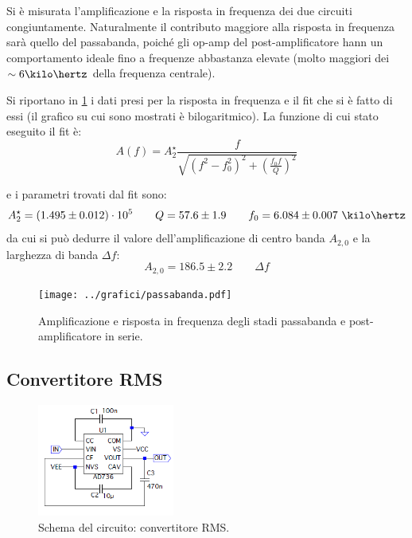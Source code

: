 \documentclass[a4paper,10pt]{article}
\begin{document}
Si è misurata l'amplificazione e la risposta in frequenza dei due circuiti congiuntamente. Naturalmente il contributo maggiore alla risposta in frequenza sarà quello del passabanda, poiché gli op-amp del post-amplificatore hann un comportamento ideale fino a frequenze abbastanza elevate (molto maggiori dei $\sim 6 \kilo\hertz $ della frequenza centrale).

Si riportano in \cref{fig:bandpass} i dati presi per la risposta in frequenza e il fit che si è fatto di essi (il grafico su cui sono mostrati è bilogaritmico).
La funzione di cui stato eseguito il fit è:
\[ A(f) = A_2^\star \frac{f}{\sqrt{(f^2-f_0^2)^2 + \left(\frac{f_0 f}{Q}\right)^2}} \]

e i parametri trovati dal fit sono:
\[ A_2^\star=(1.495 \pm 0.012)\cdot10^5 \qquad Q=57.6 \pm 1.9 \qquad f_0=6.084 \pm 0.007~\kilo\hertz  \]
da cui si può dedurre il valore dell'amplificazione di centro banda $ A_{2,0} $ e la larghezza di banda $ \Delta f $:
\[ A_{2,0} = 186.5 \pm 2.2	\qquad	\Delta f \]

\begin{figure}[H]
	\centering
	\texttt{[image: ../grafici/passabanda.pdf]}
	\vspace*{10pt}
	\caption{Amplificazione e risposta in frequenza degli stadi passabanda e post-amplificatore in serie.}
	\label{fig:bandpass}
\end{figure}

\subsection{Convertitore RMS}

\begin{figure}
	\vspace{-10pt}
	\centering
	\includegraphics[width=0.4\textwidth]{../grafici/RMSconverter.png}
	\vspace{-12pt}
	\caption{Schema del circuito: convertitore RMS.}
	\label{fig:powamp}
	\vspace{-6pt}
\end{figure}
\end{document}

